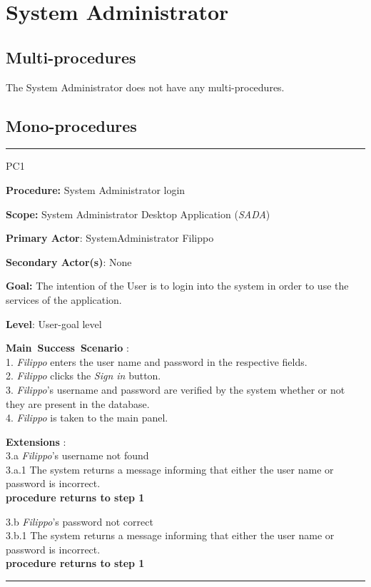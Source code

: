 \section{System Administrator}
\label{chap:usage_guide}

\subsection{Multi-procedures}

The System Administrator does not have any multi-procedures. 

\subsection{Mono-procedures}


\vspace{0.5cm}
\hrule
\begin{lyxlist}{PC1}
\small{
\item [\textbf{Procedure:}] System Administrator login
\item [\textbf{Scope:}] System Administrator Desktop Application (\emph{SADA})
\item [\textbf{Primary Actor}:] SystemAdministrator Filippo
\item [\textbf{Secondary Actor(s)}:] None
\item [\textbf{Goal:}] The intention of the User is to login into the system in
order to use the services of the application.
\item [\textbf{Level}:] User-goal level
\item [\textbf{Main~Success~Scenario}]:\\
1. \emph{Filippo} enters the user name and password in the respective
fields.\\
2. \emph{Filippo} clicks the \emph{Sign in} button. \\ 
3. \emph{Filippo}'s username and password are verified by the system whether or
not they are present in the database. \\ 
4. \emph{Filippo} is taken to the main panel. \\


\item [\textbf{Extensions}]:\\
3.a \emph{Filippo}'s username not found\\
\hspace*{0.5cm} 3.a.1 The system returns a message informing that either the
user name or password is incorrect. \\
\hspace*{0.5cm} \textbf{procedure returns to step 1}

3.b \emph{Filippo}'s password not correct \\
\hspace*{0.5cm} 3.b.1 The system returns a message informing that either the
user name or password is incorrect. \\
\hspace*{0.5cm} \textbf{procedure returns to step 1}

}

\end{lyxlist}
\hrule

